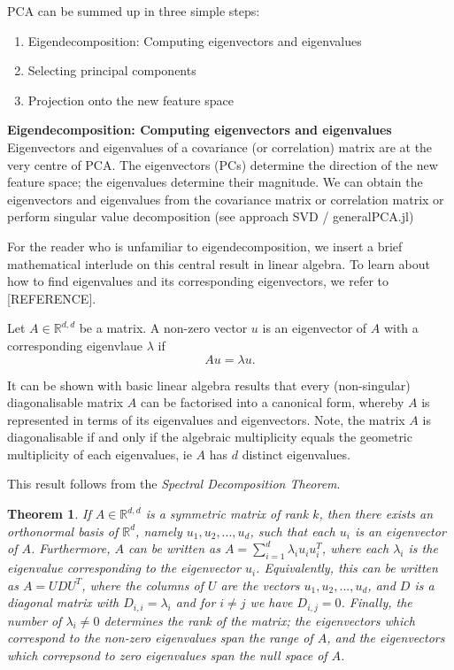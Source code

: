 \documentclass[journal, a4paper]{IEEEtran}
\newtheorem{theorem}{Theorem}[section]
\begin{document}
PCA can be summed up in three simple steps:
\begin{enumerate}
	\item Eigendecomposition: Computing eigenvectors and eigenvalues
	\item Selecting principal components
	\item Projection onto the new feature space
\end{enumerate}
%
\textbf{Eigendecomposition: Computing eigenvectors and eigenvalues}\\
Eigenvectors and eigenvalues of a covariance (or correlation) matrix are at the very centre of PCA. The eigenvectors (PCs) determine the direction of the new feature space; the eigenvalues determine their magnitude. 
We can obtain the eigenvectors and eigenvalues from the covariance matrix or correlation matrix or perform singular value decomposition (see approach SVD / generalPCA.jl)

For the reader who is unfamiliar to eigendecomposition, we insert a brief mathematical interlude on this central result in linear algebra. To learn about how to find eigenvalues and its corresponding eigenvectors, we refer to [REFERENCE].

Let \( A \in \mathbb{R}^{d,d}\) be a matrix. A non-zero vector \( u \) is an eigenvector of \( A \) with a corresponding eigenvlaue \( \lambda \) if 
\begin{equation}
	A u = \lambda u .
\end{equation}

It can be shown with basic linear algebra results that every (non-singular) diagonalisable matrix \( A \) can be factorised into a canonical form, whereby \( A \) is represented in terms of its eigenvalues and eigenvectors.
Note, the matrix \( A \) is diagonalisable if and only if the algebraic multiplicity equals the geometric multiplicity of each eigenvalues, ie \( A \) has \( d \) distinct eigenvalues.

This result follows from the \textit{Spectral Decomposition Theorem}. 
\begin{theorem}\label{spectralthm}
	If \( A \in \mathbb{R}^{d,d}\) is a symmetric matrix of rank \( k \), then there exists an orthonormal basis of \( \mathbb{R}^d \), namely \( u_{1}, u_{2}, ..., u_{d} \), such that each \( u_{i} \) is an eigenvector of \( A \). Furthermore, \( A \) can be written as \( A = \sum_{i=1}^{d} \lambda_{i} u_{i} u_{i}^T \), where each \( \lambda_{i} \) is the eigenvalue corresponding to the eigenvector \( u_{i} \). Equivalently, this can be written as \( A = U D U^T \), where the columns of \( U \) are the vectors \( u_{1}, u_{2}, ..., u_{d} \), and \( D \) is a diagonal matrix with \( D_{i,i} = \lambda_{i} \) and for \( i \neq j \) we have \( D_{i,j} = 0 \). Finally, the number of \( \lambda_{i} \neq 0 \) determines the rank of the matrix; the eigenvectors which correspond to the non-zero eigenvalues span the range of \( A \), and the eigenvectors which correpsond to zero eigenvalues span the null space of \( A \).
\end{theorem}
\end{document}
